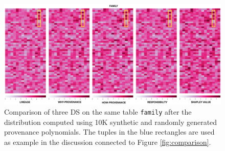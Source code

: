 \documentclass[preprint,12pt,sort&compress]{elsarticle}
\newcommand{\eat}[1]{}
\begin{document}
\begin{figure}[tb]
  \includegraphics[width=1\textwidth]{synthetic_comparison}
  \caption{Comparison of three DS on the same table \texttt{family} after the distribution computed using 10K synthetic and randomly generated provenance polynomials. The tuples in the blue rectangles are used as example in the discussion connected to Figure \ref{fig:comparison}.}
  \label{figure:comparison_on_synthetic_polynomials_2}
\end{figure}

\eat{
An example of such a synthetic provenance polynomial is:

{\footnotesize
\[
3 f_1^3 c2f_1^2 c_1^2 + 2 f_1 c2f_2^3 c_2^3 + 4 f_5 c2f_{17}^4 c_{18}^3
\] }
The corresponding why-provenance is: 
{\footnotesize
\[
\{ \{f_1, c2f_1, c_1\}, \{f_1, c2f_2, cf_2\}, \{ f_5, c2f_{17}, c_{18}\} \}
\] 
}
and corresponding lineage is: 

{\footnotesize
\[
\{f_1, f_5, c2f_1, c_1, c2f_1, c2f_2, c2f_{17}, c_1, c_2, c_{18} \}
\]}
 
 Using {\em how-provenance}, the distribution obtained from this sample polynomial is:

{\footnotesize
\[
f_1 = \frac{59}{315}, f_5 = \frac{1}{18}, c2f_1 = \frac{2}{21}, c2f_2 = \frac{2}{15}, 
c2f_{17}=\frac{2}{9} , c_1 = \frac{2}{21}, c_2 = \frac{2}{15}, c_{17} = \frac{1}{6} 
\]
}

Using {\em why-provenance}, the distribution is:

{\footnotesize
\[
f_1 = \frac{2}{9}, f_5 = \frac{1}{9}, c2f_1 = \frac{1}{9}, c2f_2 = \frac{1}{9}, 
c2f_{17}=\frac{1}{9} , c_1 = \frac{1}{9}, c_2 = \frac{1}{9}, c_{17} = \frac{1}{9} 
\]
}


Finally, with {|em lineage}, the distribution is:

{\footnotesize
\[
f_1 = \frac{1}{8}, f_5 = \frac{1}{8}, c2f_1 = \frac{1}{8}, c2f_2 = \frac{1}{8}, 
c2f_{17}=\frac{1}{8} , c_1 = \frac{1}{8}, c_2 = \frac{1}{8}, c_{17} = \frac{1}{8} 
\]
}
}
\end{document}
